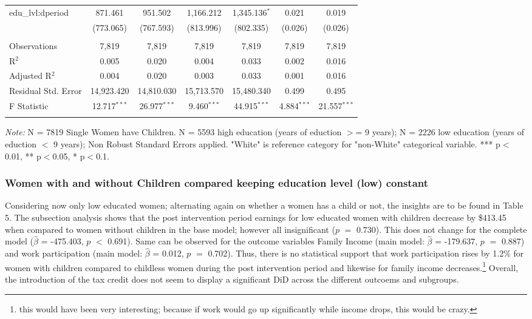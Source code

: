 \documentclass[a4paper]{article}
\begin{document}
\begin{table}[!htbp]
\begin{adjustwidth}{0.cm}{-0cm}
\begin{threeparttable}
\begin{tabular}{@{\extracolsep{-1pt}}lcccccc}
  edu\_lvl:dperiod & 871.461 & 951.502 & 1,166.212 & 1,345.136$^{*}$ & 0.021 & 0.019 \\ 
  & (773.065) & (767.593) & (813.996) & (802.335) & (0.026) & (0.026) \\ 
 \hline \\[-1.8ex] 
Observations & 7,819 & 7,819 & 7,819 & 7,819 & 7,819 & 7,819 \\ 
R$^{2}$ & 0.005 & 0.020 & 0.004 & 0.033 & 0.002 & 0.016 \\ 
Adjusted R$^{2}$ & 0.004 & 0.020 & 0.003 & 0.033 & 0.001 & 0.016 \\ 
Residual Std. Error & 14,923.420& 14,810.030 & 15,713.570 & 15,480.340  & 0.499  & 0.495 \\ 
F Statistic & 12.717$^{***}$  & 26.977$^{***}$ & 9.460$^{***}$ & 44.915$^{***}$  & 4.884$^{***}$  & 21.557$^{***}$  \\ 
\hline 
\hline \\[-3.5ex] 
\end{tabular} 
\begin{tablenotes}
      \small
      \item\textit{Note:} N = 7819 Single Women have Children. N = 5593 high education (years of eduction $>$= 9 years); N = 2226 low education (years of eduction $<$ 9 years); Non Robust Standard Errors applied. "White" is reference category for "non-White" categorical variable. *** p$<$0.01, ** p$<$0.05, * p$<$0.1.
    \end{tablenotes}
\end{threeparttable}
\end{adjustwidth}
%
\end{table}

\subsubsection{Women with and without Children compared keeping education level (low) constant}

Considering now only low educated women; alternating again on whether a women has a child or not, the insights are to be found in Table 5. 
The subsection analysis shows that the post intervention period earnings for low educated women with children decrease by \$413.45 when compared to women without children in the base model; however all insignificant ($p$ $=$ 0.730). This does not change for the complete model ($\hat{\beta}$ = -475.403, $p$ $<$ 0.691). Same can be observed for the outcome variables Family Income (main model: $\hat{\beta}$ = -179.637, $p$ $=$ 0.887) and work participation (main model: $\hat{\beta}$ = 0.012, $p$ $=$ 0.702). Thus, there is no statistical support that work participation rises by 1.2\% for women with children compared to childless women during the post intervention period and likewise for family income decreases.\footnote{this would have been very interesting; because if work would go up significantly while income drops, this would be crazy.}
Overall, the introduction of the tax credit does not seem to display a significant DiD across the different outcoems and subgroups.
\end{document}
